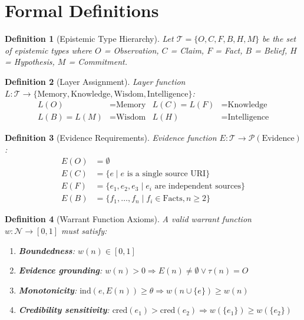 \documentclass[11pt,letterpaper]{article}
\newtheorem{definition}{Definition}[section]
\begin{document}
\appendix
\section{Formal Definitions}
\label{app:formal}

\begin{definition}[Epistemic Type Hierarchy]
\label{def:types}
Let $\mathcal{T} = \{O, C, F, B, H, M\}$ be the set of epistemic types where $O$ = Observation, $C$ = Claim, $F$ = Fact, $B$ = Belief, $H$ = Hypothesis, $M$ = Commitment.
\end{definition}

\begin{definition}[Layer Assignment]
\label{def:layers}
Layer function $L: \mathcal{T} \to \{\text{Memory}, \text{Knowledge}, \text{Wisdom}, \text{Intelligence}\}$:
\begin{align*}
L(O) &= \text{Memory} & L(C) = L(F) &= \text{Knowledge} \\
L(B) = L(M) &= \text{Wisdom} & L(H) &= \text{Intelligence}
\end{align*}
\end{definition}

\begin{definition}[Evidence Requirements]
\label{def:evidence}
Evidence function $E: \mathcal{T} \to \mathcal{P}(\text{Evidence})$:
\begin{align*}
E(O) &= \emptyset \\
E(C) &= \{e \mid e \text{ is a single source URI}\} \\
E(F) &= \{e_1, e_2, e_3 \mid e_i \text{ are independent sources}\} \\
E(B) &= \{f_1, \ldots, f_n \mid f_i \in \text{Facts}, n \geq 2\}
\end{align*}
\end{definition}

\begin{definition}[Warrant Function Axioms]
\label{def:warrant}
A valid warrant function $w: \mathcal{N} \to [0,1]$ must satisfy:
\begin{enumerate}[noitemsep]
    \item[(W1)] \textbf{Boundedness}: $w(n) \in [0,1]$
    \item[(W2)] \textbf{Evidence grounding}: $w(n) > 0 \Rightarrow E(n) \neq \emptyset \vee \tau(n) = O$
    \item[(W3)] \textbf{Monotonicity}: $\text{ind}(e, E(n)) \geq \theta \Rightarrow w(n \cup \{e\}) \geq w(n)$
    \item[(W4)] \textbf{Credibility sensitivity}: $\text{cred}(e_1) > \text{cred}(e_2) \Rightarrow w(\{e_1\}) \geq w(\{e_2\})$
\end{enumerate}
\end{definition}
\end{document}
